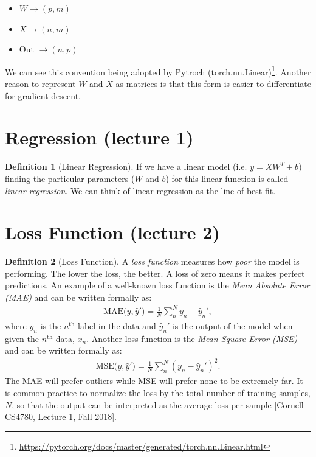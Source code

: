 \documentclass[11pt]{article}
\numberwithin{equation}{section}
\theoremstyle{definition}%
\newtheorem{definition}{Definition}[section]%
\begin{document}
\begin{itemize}
    \item {$W \rightarrow (p,m)$}
    \item {$X \rightarrow (n,m)$}
    \item {Out $\rightarrow (n,p)$}
\end{itemize}

We can see this convention being adopted by Pytroch (torch.nn.Linear)\footnote{\url{https://pytorch.org/docs/master/generated/torch.nn.Linear.html}}. Another reason to represent $W$ and $X$ as matrices is that this form is easier to differentiate for gradient descent.

\section{Regression (lecture 1)}
\begin{definition}[Linear Regression]

If we have a linear model (i.e. $y=XW^T+b$) finding the particular parameters ($W$ and $b$) for this linear function is called \emph{linear regression}. We can think of linear regression as the line of best fit. 
\end{definition}

\section{Loss Function (lecture 2)}

\begin{definition}[Loss Function]
A \emph{loss function} measures how \emph{poor} the model is performing. The lower the loss, the better. A loss of zero means it makes perfect predictions. An example of a well-known loss function is the \emph{Mean Absolute Error (MAE)} and can be written formally as:
\begin{align}
    \text{MAE($y, \hat{y}'$)} = \frac{1}{N}\sum_{n}^{N}{y_n - \hat{y}_n'},
\end{align}
where $y_n$ is the $n^{\text{th}}$ label in the data and $\hat{y}_n'$ is the output of the model when given the $n^{\text{th}}$ data, $x_n$. Another loss function is the \emph{Mean Square Error (MSE)} and can be written formally as:
\begin{align}
    \text{MSE($y, \hat{y}'$)} = \frac{1}{N}\sum_{n}^{N}{(y_n - \hat{y}_n')^2}.
\end{align}
The MAE will prefer outliers while MSE will prefer none to be extremely far. It is common practice to normalize the loss by the total number of training samples, $N$, so that the output can be interpreted as the average loss per sample [Cornell CS4780, Lecture 1, Fall 2018].

\end{definition}
\end{document}

